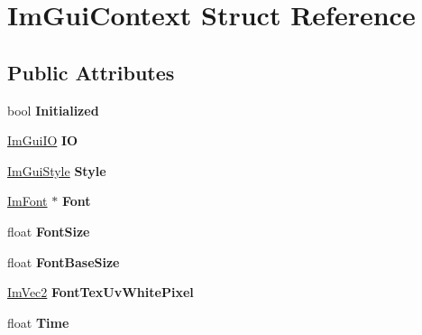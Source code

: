 \hypertarget{struct_im_gui_context}{}\section{Im\+Gui\+Context Struct Reference}
\label{struct_im_gui_context}
\subsection*{Public Attributes}
\begin{DoxyCompactItemize}
\item 
\mbox{\label{struct_im_gui_context_a71b32432f5c4658b4772b293640a66c0}} 
bool {\bfseries Initialized}
\item 
\mbox{\label{struct_im_gui_context_add4fdcc8c6a437d8f8e7c837418be83c}} 
\hyperlink{struct_im_gui_i_o}{Im\+Gui\+IO} {\bfseries IO}
\item 
\mbox{\label{struct_im_gui_context_a2e682502e1a3d2c399171dd3c4fc969d}} 
\hyperlink{struct_im_gui_style}{Im\+Gui\+Style} {\bfseries Style}
\item 
\mbox{\label{struct_im_gui_context_aec64e774018a7d74515baeb9e06fb4e3}} 
\hyperlink{struct_im_font}{Im\+Font} $\ast$ {\bfseries Font}
\item 
\mbox{\label{struct_im_gui_context_af4022d1866887cdc400131fc6a65b200}} 
float {\bfseries Font\+Size}
\item 
\mbox{\label{struct_im_gui_context_a0fcbda57d25b80111283ed7305ee3ee8}} 
float {\bfseries Font\+Base\+Size}
\item 
\mbox{\label{struct_im_gui_context_a39aec37f209c91a4e4f503bd2e365081}} 
\hyperlink{struct_im_vec2}{Im\+Vec2} {\bfseries Font\+Tex\+Uv\+White\+Pixel}
\item 
\mbox{\label{struct_im_gui_context_a88ebae89e11da57e4567767694f7576f}} 
float {\bfseries Time}
\item 
\mbox{\label{struct_im_gui_context_ab9a1f3b3f15f0a6c5f29aef85f1a8ea2}} 

\end{DoxyCompactItemize}
